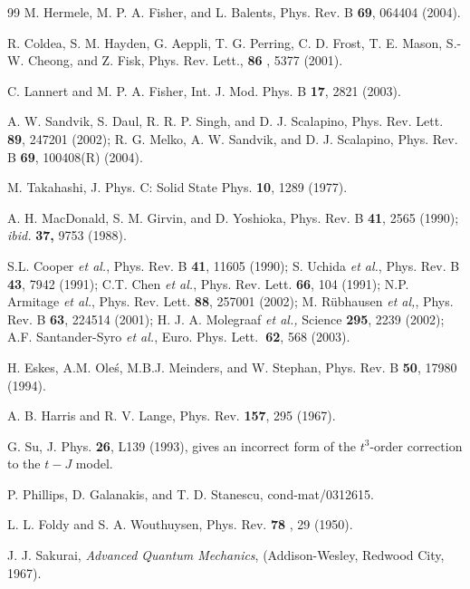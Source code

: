 \documentclass[floatfix,twocolumn,aps,prb,showpacs,superscriptaddress]{revtex4}
\begin{document}


\begin{thebibliography}{99}
 M. Hermele, M. P. A. Fisher, and L. Balents,
Phys. Rev. B {\bf 69}, 064404 (2004).


 R. Coldea, S. M. Hayden, G. Aeppli, T. G. Perring, C. D.
Frost, T. E. Mason, S.-W. Cheong, and Z. Fisk, Phys. Rev. Lett., \textbf{86}%
, 5377 (2001).


 C. Lannert and M. P. A. Fisher, Int. J. Mod. Phys. B
\textbf{17}, 2821 (2003).


 A. W. Sandvik, S. Daul, R. R. P. Singh, and D. J.
Scalapino, Phys. Rev. Lett. \textbf{89}, 247201 (2002); R. G. Melko, A. W.
Sandvik, and D. J. Scalapino, Phys. Rev. B {\bf 69}, 100408(R) (2004).


 M. Takahashi, J. Phys. C: Solid State Phys. \textbf{%
10}, 1289 (1977).


 A. H. MacDonald, S. M. Girvin, and D. Yoshioka, Phys.
Rev. B \textbf{41}, 2565 (1990); \textit{ibid. }\textbf{37, }9753 (1988).


 S.L. Cooper \textit{et al.}, Phys. Rev. B \textbf{41},
11605 (1990); S. Uchida \textit{et al.}, Phys. Rev. B \textbf{43}, 7942
(1991); C.T. Chen \textit{et al.}, Phys. Rev. Lett. \textbf{66}, 104 (1991);
N.P. Armitage \textit{et al.}, Phys. Rev. Lett. \textbf{88}, 257001 (2002);
M. R\"{u}bhausen \textit{et al,}, Phys. Rev. B \textbf{63}, 224514 (2001);
H. J. A. Molegraaf \textit{et al.,} Science \textbf{295}, 2239 (2002); A.F.
Santander-Syro \textit{et al.}, Euro. Phys. Lett.\textbf{\ 62}, 568 (2003).


 H. Eskes, A.M. Ole\'{s}, M.B.J. Meinders, and W.
Stephan, Phys. Rev. B \textbf{50}, 17980 (1994).


 A. B. Harris and R. V. Lange, Phys. Rev. \textbf{157},
295 (1967).


 G. Su, J. Phys. {\bf 26}, L139 (1993), gives an incorrect
  form of the $t^3$-order correction to the $t-J$ model.


 P. Phillips, D. Galanakis, and T. D. Stanescu, cond-mat/0312615.


 L. L. Foldy and S. A. Wouthuysen, Phys. Rev. \textbf{78}%
, 29 (1950).


 J. J. Sakurai, \textit{Advanced Quantum Mechanics},
(Addison-Wesley, Redwood City, 1967).



\end{thebibliography}
\end{document}
